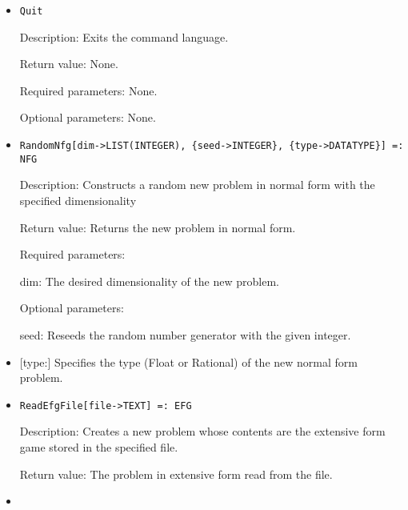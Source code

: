 \begin{itemize}
\ed
\ed

\item

\protect \large \begin{verbatim}
Quit
\end{verbatim}\normalsize

\bd

\item
[Description:] Exits the command language.
\item
[Return value:] None.
\item
[Required parameters:] None.
\item
[Optional parameters:] None.
\ed

\item

\protect \large \begin{verbatim}
RandomNfg[dim->LIST(INTEGER), {seed->INTEGER}, {type->DATATYPE}] =:
NFG
\end{verbatim}\normalsize

\bd
\item
[Description:] Constructs a random new problem in normal form with the
specified dimensionality
\item
[Return value:] Returns the new problem in normal form.
\item
[Required parameters:]\hfil\null
	
\bd
\item
[dim:] The desired dimensionality of the new problem.
\ed

\item
[Optional parameters:]\hfil\null
	
\bd
\item
[seed:] Reseeds the random number generator with the given integer.
\item

[type:] Specifies the type (Float or Rational) of the new normal form
problem.
\ed
\ed

\item
\protect \large \begin{verbatim}
ReadEfgFile[file->TEXT] =: EFG
\end{verbatim}\normalsize

\bd
\item
[Description:] Creates a new problem whose contents are the extensive
form game stored in the specified file.
\item
[Return value:] The problem in extensive form read from the file.
\item


\end{itemize}
